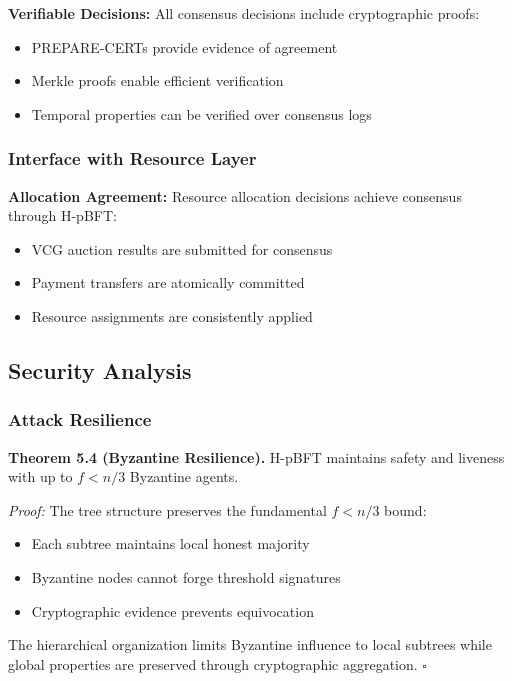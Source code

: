 \documentclass[conference]{IEEEtran}
\begin{document}
\textbf{Verifiable Decisions:} All consensus decisions include cryptographic proofs:
\begin{itemize}
    \item PREPARE-CERTs provide evidence of agreement
    \item Merkle proofs enable efficient verification
    \item Temporal properties can be verified over consensus logs
\end{itemize}

\subsubsection{Interface with Resource Layer}

\textbf{Allocation Agreement:} Resource allocation decisions achieve consensus through H-pBFT:
\begin{itemize}
    \item VCG auction results are submitted for consensus
    \item Payment transfers are atomically committed
    \item Resource assignments are consistently applied
\end{itemize}

\subsection{Security Analysis}

\subsubsection{Attack Resilience}

\textbf{Theorem 5.4 (Byzantine Resilience).} H-pBFT maintains safety and liveness with up to $f < n/3$ Byzantine agents.

\textit{Proof:} The tree structure preserves the fundamental $f < n/3$ bound:
\begin{itemize}
    \item Each subtree maintains local honest majority
    \item Byzantine nodes cannot forge threshold signatures
    \item Cryptographic evidence prevents equivocation
\end{itemize}

The hierarchical organization limits Byzantine influence to local subtrees while global properties are preserved through cryptographic aggregation. $\square$
\end{document}
